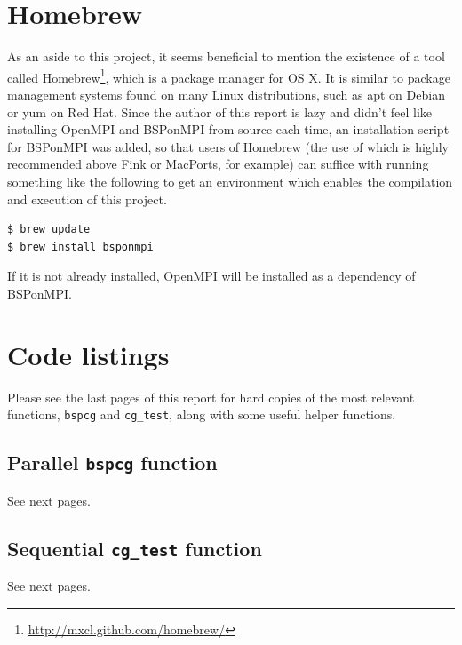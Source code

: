 \documentclass[a4paper]{article}
\begin{document}
\clearpage
\section{Homebrew}

As an aside to this project, it seems beneficial to mention the existence of a
tool called Homebrew\footnote{\url{http://mxcl.github.com/homebrew/}}, which is
a package manager for OS X. It is similar to package management systems found
on many Linux distributions, such as apt on Debian or yum on Red Hat. Since the
author of this report is lazy and didn't feel like installing OpenMPI and
BSPonMPI from source each time, an installation script for BSPonMPI was added,
so that users of Homebrew (the use of which is highly recommended above Fink or MacPorts,
for example) can suffice with running something like the following to get an
environment which enables the compilation and execution of this project.

\begin{verbatim}
$ brew update
$ brew install bsponmpi
\end{verbatim}

If it is not already installed, OpenMPI will be installed as a dependency of BSPonMPI.

\section{Code listings}

Please see the last pages of this report for hard copies of the most relevant
functions, \texttt{bspcg} and \texttt{cg\_test}, along with some useful helper functions.

\subsection{Parallel \texttt{bspcg} function}\label{sec:par-code}
See next pages.

\subsection{Sequential \texttt{cg\_test} function}\label{sec:seq-code}
See next pages.



\end{document}
